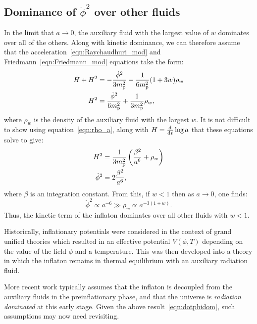 \subsection{Dominance of \(\dot{\phi}^2\) over other fluids}
\label{sec:dominance_fluids}
In the limit that \(a\to 0\), the auxiliary fluid with the largest value of \(w\) dominates over all of the others. Along with kinetic dominance, we can therefore assume that the acceleration~\eqref{eqn:Raychaudhuri_mod} and Friedmann~\eqref{eqn:Friedmann_mod} equations take the form:
%
\begin{align}
  \dot{H}+H^2 
  &= 
  -\frac{\dot{\phi}^2}{3m_{\mathrm{p}}^2} - \frac{1}{6m_{\mathrm{p}}^2}(1+3w)\rho_w
  \label{eqn:Ray_KD_eq_rho}
  \\
  H^2 
  &= 
  \frac{\dot{\phi}^2}{6m_{\mathrm{p}}^2} +  \frac{1}{3m_{\mathrm{p}}^2}\rho_w,
  \label{eqn:Friedmann_KD_eq_rho}
\end{align}
where \(\rho_w\) is the density of the auxiliary fluid with the largest \(w\).  It is not difficult to show using equation~\eqref{eqn:rho_a},
along with \(H=\frac{\operatorname{d}^{}\!{}}{\operatorname{d}^{}\!{t}}\log a\) that these equations solve to give:
%
\begin{align}
  H^2 
  &= 
  \frac{1}{3m_{\mathrm{p}}^2}\left(\frac{\beta^2}{a^6} + \rho_w\right)
  \label{eqn:H_of_a_1}
  \\
  \dot{\phi}^2 
  &= 
  2\frac{\beta^2}{a^6},
  \label{eqn:dotphi_of_a_1}
\end{align}
%
where \(\beta\) is an integration constant. From this, if \(w<1\) then as
\(a\to 0\), one finds:
%
\begin{equation}
  \dot{\phi}^2 \propto a^{-6} 
  \gg
  \rho_w \propto a^{-3(1+w)}.
  \label{eqn:dotphidom}
\end{equation}
%
Thus, the kinetic term of the inflaton dominates over all other fluids with \(w<1\).




Historically, inflationary potentials were considered in the context of grand unified theories \citep{PhysRevLett.48.1220,linde_1982} which resulted in an effective potential \(V(\phi,T)\) depending on the value of the field \(\phi\) and a temperature.  This was then developed \citep{1995PhRvL..74.1912B,PhysRevLett.75.3218} into a theory in which the inflaton remains in thermal equilibrium with an auxiliary radiation fluid.

More recent work \citep{2007PhRvD..76f3512P} typically assumes that the inflaton is decoupled from the auxiliary fluids in the preinflationary phase, and that the universe is {\em radiation dominated\/} at this early stage. Given the above result~\eqref{eqn:dotphidom}, such assumptions may now need revisiting.



